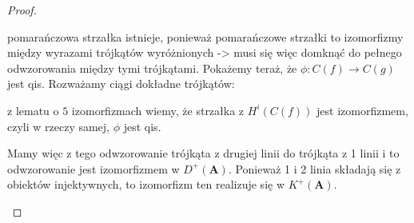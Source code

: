 \begin{proof}
\begin{enumerate}
\begin{center}
\end{center}
      pomarańczowa strzałka istnieje, ponieważ pomarańczowe strzałki to izomorfizmy między wyrazami trójkątów wyróżnionych -> musi się więc domknąć do pełnego odwzorowania między tymi trójkątami. Pokażemy teraż, że $\phi:C(f)\to C(g)$ jest qis. Rozważamy ciągi dokładne trójkątów:
      \begin{center}\end{center}
      z lematu o $5$ izomorfizmach wiemy, że strzałka z $H^i(C(f))$ jest izomorfizmem, czyli w rzeczy samej, $\phi$ jest qis.

      Mamy więc z tego odwzorowanie trójkąta z drugiej linii do trójkąta z 1 linii i to odwzorowanie jest izomorfizmem w $D^+(\mathbf{A})$. Ponieważ 1 i 2 linia składają się z obiektów injektywnych, to izomorfizm ten realizuje się w $K^+(\mathbf{A})$.


\end{enumerate}
\end{proof}
